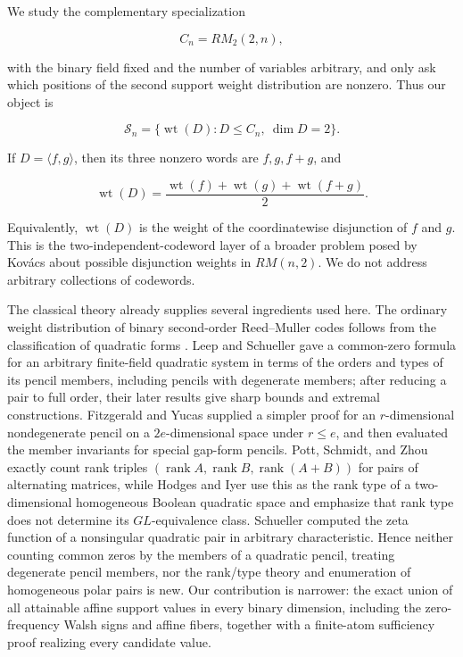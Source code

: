 \documentclass[11pt]{article}
\theoremstyle{remark}
\begin{document}
We study the complementary specialization

\[
C_n=RM_2(2,n),
\]

with the binary field fixed and the number of variables arbitrary, and only ask which positions of the second support weight distribution are nonzero. Thus our object is

\[
\mathcal S_n
=\{\operatorname{wt}(D):D\le C_n,\ \dim D=2\}.
\tag{1}
\]

If $D=\langle f,g\rangle$, then its three nonzero words are $f,g,f+g$, and

\[
\operatorname{wt}(D)
=\frac{\operatorname{wt}(f)+\operatorname{wt}(g)+\operatorname{wt}(f+g)}2.
\tag{2}
\]

Equivalently, $\operatorname{wt}(D)$ is the weight of the coordinatewise disjunction of $f$ and $g$. This is the two-independent-codeword layer of a broader problem posed by Kovács \cite{ref6} about possible disjunction weights in $RM(n,2)$. We do not address arbitrary collections of codewords.

The classical theory already supplies several ingredients used here. The ordinary weight distribution of binary second-order Reed--Muller codes follows from the classification of quadratic forms \cite{ref9}. Leep and Schueller \cite[Theorem 3.6]{ref7} gave a common-zero formula for an arbitrary finite-field quadratic system in terms of the orders and types of its pencil members, including pencils with degenerate members; after reducing a pair to full order, their later results give sharp bounds and extremal constructions. Fitzgerald and Yucas \cite[Theorem 2]{ref10} supplied a simpler proof for an $r$-dimensional nondegenerate pencil on a $2e$-dimensional space under $r\le e$, and then evaluated the member invariants for special gap-form pencils. Pott, Schmidt, and Zhou \cite{ref11} exactly count rank triples $(\operatorname{rank}A,\operatorname{rank}B,\operatorname{rank}(A+B))$ for pairs of alternating matrices, while Hodges and Iyer \cite{ref12} use this as the rank type of a two-dimensional homogeneous Boolean quadratic space and emphasize that rank type does not determine its $GL$-equivalence class. Schueller \cite{ref8} computed the zeta function of a nonsingular quadratic pair in arbitrary characteristic. Hence neither counting common zeros by the members of a quadratic pencil, treating degenerate pencil members, nor the rank/type theory and enumeration of homogeneous polar pairs is new. Our contribution is narrower: the exact union of all attainable affine support values in every binary dimension, including the zero-frequency Walsh signs and affine fibers, together with a finite-atom sufficiency proof realizing every candidate value.
\end{document}
